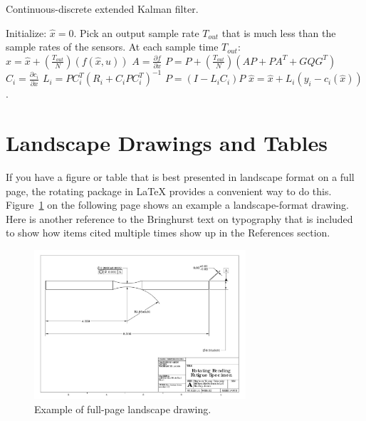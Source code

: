 \begin{algorithm}
	\caption{{\color{black} Continuous-discrete extended Kalman filter.}} \label{alg:ekf}
	\begin{algorithmic}[1]
	    \State Initialize:  $\hat{x} = 0$.
	    \State Pick an output sample rate $T_{\textit{out}}$ that is much less than
	    the sample rates of the sensors.
	    \State At each sample time $T_{\textit{out}}$:
	        \State $\hat{x} = \hat{x} + \left(\frac{T_{\textit{out}}}{N}\right) \left( f(\hat{x}, u)\right)$
	        \State $A = \frac{\partial{f}}{\partial{x}}$
	        \State $P = P + \left(\frac{T_{\textit{out}}}{N}\right)
	        \left(AP+PA^T + GQG^T\right)$
	    \EndFor
	        \State $C_i = \frac{\partial{c_i}}{\partial{x}}$
	        \State $L_i = PC_i^T(R_i+C_iPC_i^T)^{-1}$
	        \State $P = (I-L_iC_i)P$
	        \State $\hat{x} = \hat{x} +  L_i\left( y_i - c_i( \hat{x})
	        \right)$.
	    \EndIf
	\end{algorithmic}
\end{algorithm}

\section{Landscape Drawings and Tables}
If you have a figure or table that is best presented in landscape format on a full page, the {\ttfamily rotating} package in \LaTeX{} provides a convenient way to do this. Figure~\ref{fig:landscape_dwg} on the following page shows an example a landscape-format drawing. Here is another reference to the Bringhurst text on typography that is included to show how items cited multiple times show up in the References section.
\begin{figure}
	\centering
	\includegraphics[width=0.7\textwidth]{figures/part_dwg_landscape.pdf}
	\caption{Example of full-page landscape drawing.}
	\label{fig:landscape_dwg}	
\end{figure}


